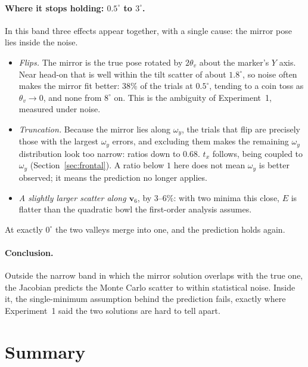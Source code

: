 \documentclass[11pt,a4paper]{article}
\theoremstyle{remark}
\newcommand{\vvec}{\mathbf{v}}
\begin{document}
\paragraph{Where it stops holding: $0.5^{\circ}$ to $3^{\circ}$.} In this band
three effects appear together, with a single cause: the mirror pose lies inside
the noise.
\begin{itemize}[leftmargin=*]
  \item \emph{Flips.} The mirror is the true pose rotated by $2\theta_v$ about the
        marker's $Y$ axis. Near head-on that is well within the tilt scatter of
        about $1.8^{\circ}$, so noise often makes the mirror fit better: $38\%$
        of the trials at $0.5^{\circ}$, tending to a coin toss as
        $\theta_v \to 0$, and none from $8^{\circ}$ on. This is the ambiguity of
        Experiment~1, measured under noise.
  \item \emph{Truncation.} Because the mirror lies along $\omega_y$, the trials
        that flip are precisely those with the largest $\omega_y$ errors, and
        excluding them makes the remaining $\omega_y$ distribution look too
        narrow: ratios down to $0.68$. $t_x$ follows, being coupled to
        $\omega_y$ (Section~\ref{sec:frontal}). A ratio below $1$ here does not
        mean $\omega_y$ is better observed; it means the prediction no longer
        applies.
  \item \emph{A slightly larger scatter along $\vvec_6$}, by $3$--$6\%$: with two
        minima this close, $E$ is flatter than the quadratic bowl the
        first-order analysis assumes.
\end{itemize}
At exactly $0^{\circ}$ the two valleys merge into one, and the prediction holds
again.

\paragraph{Conclusion.} Outside the narrow band in which the mirror solution
overlaps with the true one, the Jacobian predicts the Monte Carlo scatter to
within statistical noise. Inside it, the single-minimum assumption behind the
prediction fails, exactly where Experiment~1 said the two solutions are hard to
tell apart.

\section{Summary}
\end{document}
